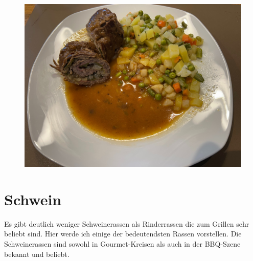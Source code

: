 \begin{figure}[htbp]
	\centering
	\begin{minipage}{1\textwidth}
		\centering
		\includegraphics[width=.9\linewidth]{pics/Rinderrouladen}
		\label{fig:Rinderrouladen}
	\end{minipage}
\end{figure}
\newpage

\section{Schwein}

Es gibt deutlich weniger Schweinerassen als Rinderrassen die zum Grillen 
sehr beliebt 
sind. Hier werde ich einige der bedeutendsten Rassen vorstellen. Die 
Schweinerassen  sind sowohl in Gourmet-Kreisen als auch in der 
BBQ-Szene bekannt und beliebt.

